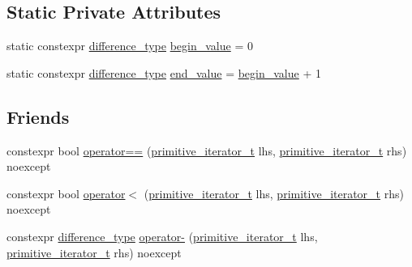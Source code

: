 \subsection*{Static Private Attributes}
\begin{DoxyCompactItemize}
\item 
static constexpr \hyperlink{classnlohmann_1_1detail_1_1primitive__iterator__t_af3db0d5c90de427d51645fe73a015553}{difference\+\_\+type} \hyperlink{classnlohmann_1_1detail_1_1primitive__iterator__t_afcb3bcf9da8aa95bd82067d1a67c2326}{begin\+\_\+value} = 0
\item 
static constexpr \hyperlink{classnlohmann_1_1detail_1_1primitive__iterator__t_af3db0d5c90de427d51645fe73a015553}{difference\+\_\+type} \hyperlink{classnlohmann_1_1detail_1_1primitive__iterator__t_aa37c37da44f19e6ec1d7d4a9910511c7}{end\+\_\+value} = \hyperlink{classnlohmann_1_1detail_1_1primitive__iterator__t_afcb3bcf9da8aa95bd82067d1a67c2326}{begin\+\_\+value} + 1
\end{DoxyCompactItemize}
\subsection*{Friends}
\begin{DoxyCompactItemize}
\item 
constexpr bool \hyperlink{classnlohmann_1_1detail_1_1primitive__iterator__t_aae1e1e2ec0e229d1291d69de57d76bbe}{operator==} (\hyperlink{classnlohmann_1_1detail_1_1primitive__iterator__t}{primitive\+\_\+iterator\+\_\+t} lhs, \hyperlink{classnlohmann_1_1detail_1_1primitive__iterator__t}{primitive\+\_\+iterator\+\_\+t} rhs) noexcept
\item 
constexpr bool \hyperlink{classnlohmann_1_1detail_1_1primitive__iterator__t_a901a95e6d73c9509d3dcde914f6c8a9d}{operator$<$} (\hyperlink{classnlohmann_1_1detail_1_1primitive__iterator__t}{primitive\+\_\+iterator\+\_\+t} lhs, \hyperlink{classnlohmann_1_1detail_1_1primitive__iterator__t}{primitive\+\_\+iterator\+\_\+t} rhs) noexcept
\item 
constexpr \hyperlink{classnlohmann_1_1detail_1_1primitive__iterator__t_af3db0d5c90de427d51645fe73a015553}{difference\+\_\+type} \hyperlink{classnlohmann_1_1detail_1_1primitive__iterator__t_ac6d902d6ec9a02dabed5452d3ae78f7e}{operator-\/} (\hyperlink{classnlohmann_1_1detail_1_1primitive__iterator__t}{primitive\+\_\+iterator\+\_\+t} lhs, \hyperlink{classnlohmann_1_1detail_1_1primitive__iterator__t}{primitive\+\_\+iterator\+\_\+t} rhs) noexcept
\end{DoxyCompactItemize}


